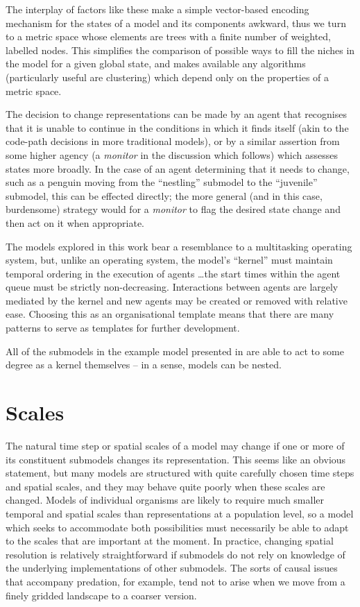 The interplay of factors like these make a simple vector-based
encoding mechanism for the states of a model and its components
awkward, thus we turn to a metric space whose elements are trees with
a finite number of weighted, labelled nodes. This simplifies the
comparison of possible ways to fill the niches in the model for a
given global state, and makes available any algorithms (particularly
useful are clustering) which depend only on the properties of a metric
space.

The decision to change representations can be made by an agent that
recognises that it is unable to continue in the conditions in which it
finds itself (akin to the code-path decisions in more traditional
models), or by a similar assertion from some higher agency
(a \emph{monitor\/} in the discussion which follows) which assesses
states more broadly.  In the case of an agent determining that it
needs to change, such as a penguin moving from the ``nestling''
submodel to the ``juvenile'' submodel, this can be effected directly;
the more general (and in this case, burdensome) strategy would
for a \emph{monitor\/} to flag the desired state change and then act
on it when appropriate.

The models explored in this work bear a resemblance to a multitasking
operating system, but, unlike an operating system, the model's ``kernel''
must maintain temporal ordering in the execution of agents \ldots the
start times within the agent queue must be strictly non-decreasing.
Interactions between agents are largely mediated by the kernel and
new agents may be created or removed with relative ease.  Choosing
this as an organisational template means that there are many patterns
to serve as templates for further development.

All of the submodels in the example model presented in \Cfive are able
to act to some degree as a kernel themselves -- in a sense, models can
be nested.

\section{Scales}
The natural time step or spatial scales of a model may change if one
or more of its constituent submodels changes its representation.
This seems like an obvious statement, but many models are structured
with quite carefully chosen time steps and spatial scales, and they
may behave quite poorly when these scales are changed.  Models of
individual organisms are likely to require much smaller temporal and
spatial scales than representations at a population level, so a model
which seeks to accommodate both possibilities must necessarily be able
to adapt to the scales that are important at the moment.  In practice,
changing spatial resolution is relatively straightforward if submodels
do not rely on knowledge of the underlying implementations of other
submodels.  The sorts of causal issues that accompany predation, for
example, tend not to arise when we move from a finely gridded
landscape to a coarser version.

